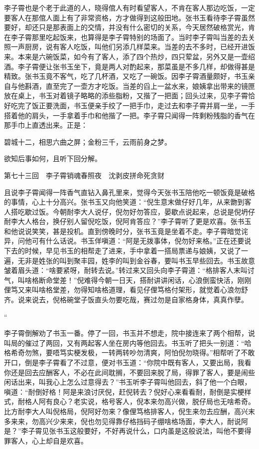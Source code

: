 \documentclass[12pt,UTF8]{ctexbook}
\begin{document}
{{{李子霄也是个老于此道的人，晓得倌人有时看望客人，不肯在客人那边吃饭，一定要客人在那倌人面上有了非常资格，方才做得到这般田地。张书玉看待李子霄虽然要好，却还只是那表面上的交情，并没有什么密切的关系，今天居然破格赏光，肯在李子霄那里吃起饭来，也算得是李子霄特别的场面了。当时李子霄叫当差的去关照一声厨房，说有客人吃饭，叫他们另添几样菜来。当差的去不多时，已经开进饭来。本来是六碗饭菜，如今有了客人，添了四个热炒，四只荤盆，另外又是一壶绍酒。李子霄便让张书玉坐下，竟是两人对酌起来，那菜虽是不多几样，却做得甚是精致。张书玉竟不客气，吃了几杯酒，又吃了一碗饭。因李子霄酒量颇好，书玉亲自与他斟酒，直至完了一壶方才吃饭。当差的舀上一盆水来，娘姨拿出带来的镜匣放在桌上，书玉对着镜子略略的添些脂粉，又揩了一把面；回头过来，见李子霄恰好吃完了饭正要洗面，书玉便亲手绞了一把手巾，走过去和李子霄并肩一坐，一手搭着他的肩头，一手拿着手巾和他揩了一把。李子霄只闻得一阵剩粉残脂的香气在那手巾上直透出来。正是：

碧城十二，相思六曲之屏；金粉三千，云雨前身之梦。

欲知后事如何，且听下回分解。





第七十三回　李子霄销魂春照夜　沈剥皮拼命死贪财





且说李子霄闻得一阵香气直钻入鼻孔里来，觉得今天张书玉陪他吃一顿饭竟是破格的事情，心上十分高兴。张书玉又向他笑道：“倪生意末做仔好几年，从来朆到客人搭吃歇过饭。今朝耐李大人说仔，倪勿好勿答应，晏歇点说起来，总说是倪坍仔耐李大人格台，换仔别人留倪吃饭，倪阿肯答应？”李子霄听了更是欢喜。张书玉和他说说笑笑，甚是投机。直到傍晚时分，张书玉竟是坐着不走。李子霄暗觉诧异，问他可有什么话说。书玉佯嗔道：“阿是无拨事体，倪勿好来格。”正在还要说下去的时候，早见书玉的相帮走了进来，手中拿着一搭局票递与娘姨，又说了一遍，无非是姓张的叫到聚丰园，姓李的叫到金谷春，要叫书玉早些回去。书玉故意皱着眉头道：“啥要紧呀，耐转去说。”转过来又回头向李子霄道：“格排客人末叫讨气，叫啥格断命堂差！”倪难得今朝一日天，搭耐讲讲闲话，心浪倒蛮快活，刚刚俚笃又来叫啥格堂差，勿得知啥格道理，看见仔俚笃格付架形，就觉着心浪勿舒齐。说来说去，倪格碗堂子饭直头勿要吃哉，赛过勿是自家格身体，真真作孽。

“

李子霄倒解劝了书玉一番。停了一回，书玉并不想走，院中接连来了两个相帮，说叫局的催过了两回，又有两起客人坐在房内等他回去。书玉听了把头一别道：“哈格希奇勿煞，要唔笃实梗发极，一转两转吵勿清爽，阿怕倪勿晓得。”相帮听了不敢开口，倒是李子霄看了不过意，便对书玉道：“你院中既有客人，又要出局，我看你还是回去应酬客人，不必在此间耽搁，不要回来脱了局，得罪了客人，要是闹些闲话出来，叫我心上怎么过意得去？”书玉听李子霄叫他回去，斜了他一个白眼，嗔道：“耐倒好格！阿是来浪讨厌倪，赶倪转去？倪好心来看看耐，耐倒是实梗样式，耐格人阿有良心？老实说，格号客人，倪本来勿高兴做，脱仔局也无啥希奇。比方耐李大人叫倪格局，倪阿好勿来？像俚笃格排客人，倪生来勿去应酬，高兴末多来来，勿高兴少来来，倪也勿见得靠仔格挡码子绷啥格场面，李大人，耐说阿是？”李子霄见张书玉这般要好，不好再说什么，口内虽是这般说法，叫他不要得罪客人，心上却自是欢喜。

}}}
\end{document}
